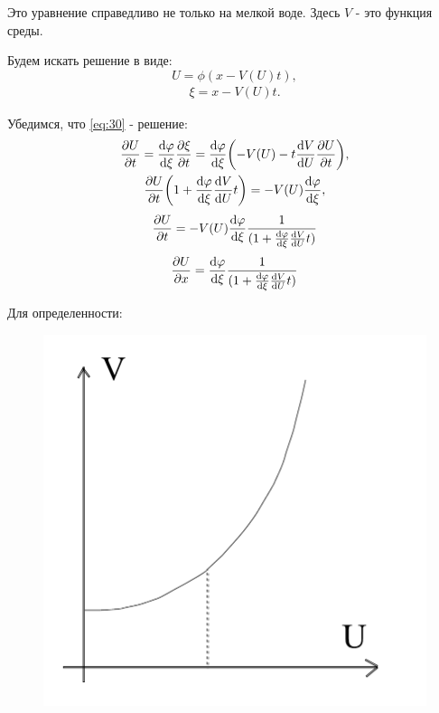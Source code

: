Это уравнение справедливо не только на мелкой воде. Здесь $V$ - это функция среды.

Будем искать решение в виде:
\begin{equation}
	U = \phi(x-V(U)t),
	\label{eq:31}
\end{equation}
\begin{gather*}
	\xi=x-V(U)t.
\end{gather*}

Убедимся, что \eqref{eq:30} - решение:
\begin{gather*}
	\pdv{U}{t}=\dv{\varphi}{\xi}\pdv{\xi}{t}=\dv{\varphi}{\xi}\qty(-V(U)-t\dv{V}{U}\pdv{U}{t}), \\ \pdv{U}{t}\qty(1+\dv{\varphi}{\xi}\dv{V}{U}t)=-V(U)\dv{\varphi}{\xi},
\end{gather*}
\begin{equation}
	\pdv{U}{t}=-V(U)\dv{\varphi}{\xi} \frac{1}{(1+\dv{\varphi}{\xi}\dv{V}{U}t)}
	\label{eq:32}
\end{equation}
\begin{gather*}
	\pdv{U}{x}=\dv{\varphi}{\xi} \frac{1}{(1+\dv{\varphi}{\xi}\dv{V}{U}t)}
\end{gather*}

Для определенности:
\begin{figure}[H]
	\centering
	\includegraphics[width=0.4\linewidth]{fig/fig12.pdf}   
\end{figure}

